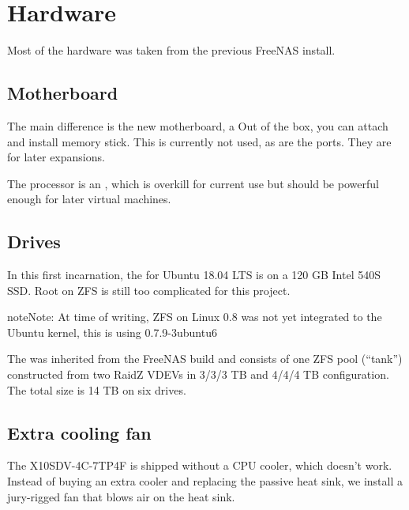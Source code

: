 \documentclass[a4paper,10pt,english]{sphinxmanual}
\begin{document}
\chapter{Hardware}
\label{\detokenize{hardware:hardware}}\label{\detokenize{hardware::doc}}
Most of the hardware was taken from the previous FreeNAS install.


\section{Motherboard}
\label{\detokenize{hardware:motherboard}}
The main difference is the new motherboard, a 
Out of the box, you can attach  and install  memory stick. This is currently not used, as are the  ports. They are for later expansions.

The processor is an , which is overkill
for current use but should be powerful enough for later virtual machines.


\section{Drives}
\label{\detokenize{hardware:drives}}
In this first incarnation, the  for Ubuntu 18.04 LTS is
on a 120 GB Intel 540S SSD. Root on ZFS is still too complicated for this
project.

\begin{sphinxadmonition}{note}{Note:}
At time of writing, ZFS on Linux 0.8 was not yet integrated to the
Ubuntu kernel, this is using 0.7.9-3ubuntu6
\end{sphinxadmonition}

The  was inherited from the FreeNAS build and consists of one
ZFS pool (“tank”) constructed from two RaidZ VDEVs in 3/3/3 TB and 4/4/4 TB
configuration. The total size is 14 TB on six drives.


\section{Extra cooling fan}
\label{\detokenize{hardware:extra-cooling-fan}}
The X10SDV-4C-7TP4F is shipped without a CPU cooler, which doesn’t work. Instead
of buying an extra cooler and replacing the passive heat sink, we install a
jury-rigged fan that blows air on the heat sink.
\end{document}
